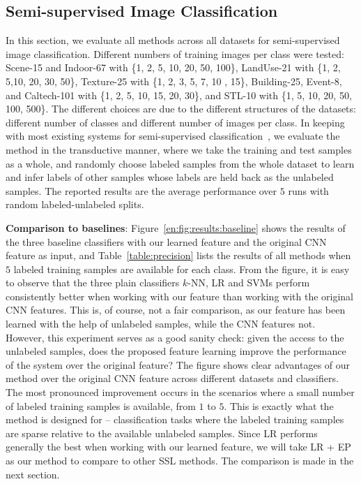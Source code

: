 \subsection{Semi-supervised Image Classification}
\label{en:sec:sic}
In this section, we evaluate all methods across all datasets for
semi-supervised image classification. Different numbers of training
images per class were tested: Scene-15 and Indoor-67 with \{1, 2,
5, 10, 20, 50, 100\}, LandUse-21 with \{1, 2, 5,10, 20, 30, 50\},
Texture-25 with \{1, 2, 3, 5, 7, 10 , 15\}, Building-25, Event-8,
and Caltech-101 with \{1, 2, 5, 10, 15, 20, 30\}, and STL-10
with \{1, 5, 10, 20, 50, 100, 500\}. The different choices are due
to the different structures of the datasets: different number of
classes and different number of images per class.  In keeping with
most existing systems for semi-supervised
classification~\citep{Zhu:Harmonic:03, Zhou:nips:04,
  icml10:large:graph:ssl, Fergus09, eccv10:ssl, ecml14:ssl}, we
evaluate the method in the transductive manner, where we take the
training and test samples as a whole, and randomly choose labeled
samples from the whole dataset to learn and infer labels of other
samples whose labels are held back as the unlabeled samples.  The
reported results are the average performance over $5$ runs with random
labeled-unlabeled splits.

\textbf{Comparison to baselines}: Figure~\ref{en:fig:results:baseline}
shows the results of the three baseline classifiers with our learned
feature and the original CNN feature as input, and
Table~\ref{table:precision} lists the results of all methods when $5$
labeled training samples are available for each class. From the figure,
it is easy to observe that the three plain classifiers $k$-NN, LR and
SVMs perform consistently better when working with our feature than
working with the original CNN features.  This is, of course, not a fair
comparison, as our feature has been learned with the help of unlabeled
samples, while the CNN features not. However, this experiment
serves as a good sanity check: given the access to the unlabeled
samples, does the proposed feature learning improve the performance of
the system over the original feature? The figure shows clear
advantages of our method over the original CNN feature across
different datasets and classifiers. The most pronounced improvement
occurs in the scenarios where a small number of labeled training
samples is available, \eg from $1$ to $5$. This is exactly what the
method is designed for -- classification tasks where the labeled
training samples are sparse relative to the available unlabeled
samples.  Since LR performs generally the best when working with our
learned feature, we will take LR + EP as our method to compare to
other SSL methods. The comparison is made in the next section.


